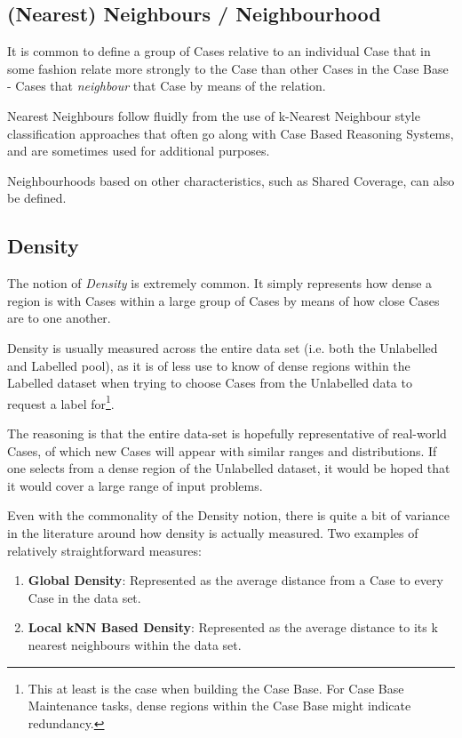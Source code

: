 \documentclass[a4paper,11pt]{report}
\begin{document}
\subsection{(Nearest) Neighbours / Neighbourhood}
It is common to define a group of Cases relative to an individual Case that in some fashion relate more strongly to the Case than other Cases in the Case Base - Cases that \emph{neighbour} that Case by means of the relation.

Nearest Neighbours follow fluidly from the use of k-Nearest Neighbour style classification approaches that often go along with Case Based Reasoning Systems, and are sometimes used for additional purposes.

Neighbourhoods based on other characteristics, such as Shared Coverage, can also be defined.

\subsection{Density}
The notion of \emph{Density} is extremely common. It simply represents how dense a region is with Cases within a large group of Cases by means of how close Cases are to one another.

Density is usually measured across the entire data set (i.e. both the Unlabelled and Labelled pool), as it is of less use to know of dense regions within the Labelled dataset when trying to choose Cases from the Unlabelled data to request a label for\footnote{This at least is the case when building the Case Base. For Case Base Maintenance tasks, dense regions within the Case Base might indicate redundancy.}. 

The reasoning is that the entire data-set is hopefully representative of real-world Cases, of which new Cases will appear with similar ranges and distributions. If one selects from a dense region of the Unlabelled dataset, it would be hoped that it would cover a large range of input problems.

Even with the commonality of the Density notion, there is quite a bit of variance in the literature around how density is actually measured. Two examples of relatively straightforward measures:
\begin{enumerate}
	\item \textbf{Global Density}: Represented as the average distance from a Case to every Case in the data set\citep{Xu2007}.
	\item \textbf{Local kNN Based Density}: Represented as the average distance to its k nearest neighbours within the data set\citep{Zhu2008}.
\end{enumerate}
\end{document}
